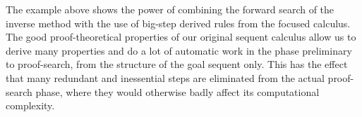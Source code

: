
The example above shows the power of combining the forward search of the inverse
method with the use of big-step derived rules from the focused calculus.  The
good proof-theoretical properties of our original sequent calculus allow us to
derive many properties and do a lot of automatic work in the phase preliminary
to proof-search, from the structure of the goal sequent only. This has the
effect that many redundant and inessential steps are eliminated from the actual
proof-search phase, where they would otherwise badly affect its computational
complexity.

